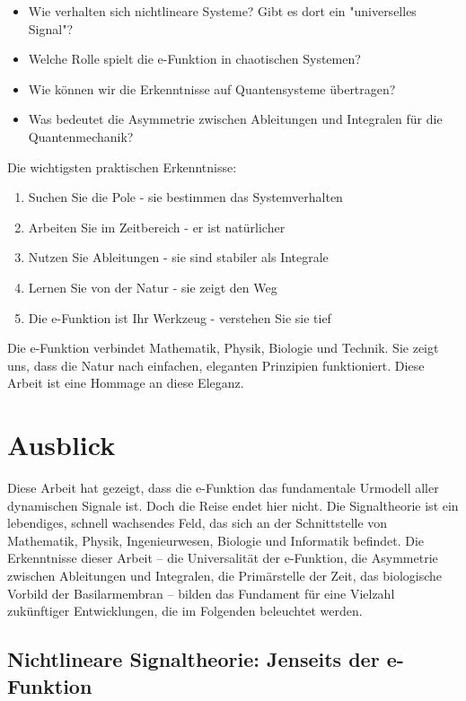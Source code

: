﻿\documentclass[a4paper,12pt]{report}
\theoremstyle{definition}
\begin{document}
	\begin{itemize}
		\item[-] Wie verhalten sich nichtlineare Systeme? Gibt es dort ein "universelles Signal"?
		\item[-] Welche Rolle spielt die e-Funktion in chaotischen Systemen?
		\item[-] Wie können wir die Erkenntnisse auf Quantensysteme übertragen?
		\item[-] Was bedeutet die Asymmetrie zwischen Ableitungen und Integralen für die Quantenmechanik?
	\end{itemize}
	Die wichtigsten praktischen Erkenntnisse:
		
	\begin{enumerate}
		\item[-] Suchen Sie die Pole - sie bestimmen das Systemverhalten
		\item[-] Arbeiten Sie im Zeitbereich - er ist natürlicher
		\item[-] Nutzen Sie Ableitungen - sie sind stabiler als Integrale
		\item[-] Lernen Sie von der Natur - sie zeigt den Weg
		\item[-] Die e-Funktion ist Ihr Werkzeug - verstehen Sie sie tief
	\end{enumerate}
	
	Die e-Funktion verbindet Mathematik, Physik, Biologie und Technik. Sie zeigt uns, dass die Natur nach einfachen, eleganten Prinzipien funktioniert. Diese Arbeit ist eine Hommage an diese Eleganz.
	
	\section{Ausblick}
	
	Diese Arbeit hat gezeigt, dass die e-Funktion das fundamentale Urmodell aller dynamischen Signa\-le ist. Doch die Reise endet hier nicht. Die Signaltheorie ist ein lebendiges, schnell wachsendes Feld, das sich an der Schnittstelle von Mathematik, Physik, Ingenieurwesen, Biologie und Informatik befindet. Die Erkenntnisse dieser Arbeit -- die Universalität der e-Funktion, die Asymmetrie zwischen Ableitungen und Integralen, die Primärstelle der Zeit, das biologische Vorbild der Basilarmembran -- bilden das Fundament für eine Vielzahl zukünftiger Entwicklungen, die im Folgenden beleuchtet werden.
	
	\subsection{Nichtlineare Signaltheorie: Jenseits der e-Funktion}
	
\end{document}
